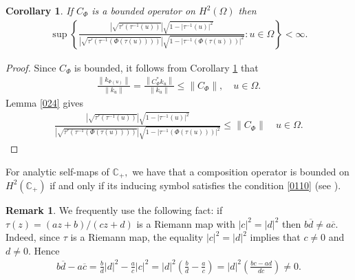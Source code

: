 \documentclass[11pt]{amsart}%
\newtheorem{cor}[thm]{Corollary}
\newtheorem{pps}[thm]{Proposition}
\theoremstyle{definition}
\newtheorem{rem}[thm]{Remark}
\theoremstyle{remark}
\numberwithin{equation}{section}
\begin{document}
\begin{cor}\label{0105} If $C_{\Phi}$ is a bounded operator on $H^2(\Omega)$ then 
\begin{align}\label{0110}
\sup\left\lbrace \frac{|\sqrt{\tau'(\tau^{-1}(u))}|\sqrt{1-|\tau^{-1}(u)|^2}}{|\sqrt{\tau'(\tau^{-1}(\Phi(\tau(u))))}|\sqrt{1-|\tau^{-1}(\Phi(\tau(u)))|^2}}:u\in \Omega\right\rbrace  < \infty.
\end{align}
\end{cor}
\begin{proof} Since $C_{\Phi}$ is bounded, it follows from Corollary \ref{0105} that
\begin{align*}
\frac{\left\| k_{\Phi(u)}\right\|}{\left\| k_u\right\| }=\frac{\left\| C_{\Phi}^*k_u\right\|}{\left\| k_u\right\| } \leq \left\| C_{\Phi}\right\| , \quad u\in \Omega.
\end{align*} 
 Lemma \ref{024} gives
\begin{align*}
\frac{|\sqrt{\tau'(\tau^{-1}(u))}|\sqrt{1-|\tau^{-1}(u)|^2}}{|\sqrt{\tau'(\tau^{-1}(\Phi(\tau(u))))}|\sqrt{1-|\tau^{-1}(\Phi(\tau(u)))|^2}}\leq \left\| C_{\Phi}\right\| \quad u\in \Omega.
\end{align*}
\end{proof}
For analytic self-maps of $\mathbb{C}_+,$ we have that a composition operator is bounded on $H^2(\mathbb{C}_+)$ if and only if its inducing symbol satisfies the condition \eqref{0110} (see \cite[Theorem 3.1]{Elliot-Jury}).

\begin{rem}
\label{078} We frequently use the following fact: if $\tau(z)=(az+b)/(cz+d)$
is a Riemann map with $|c|^{2}=|d|^{2}$ then $b\overline{d}\neq a\overline
{c}.$ Indeed, since $\tau$ is a Riemann map, the equality $|c|^{2}=|d|^{2}$
implies that $c\neq0$ and $d\neq0.$ Hence
\begin{align*}
b\overline{d}-a\overline{c}=\frac{b}{d}|d|^{2}-\frac{a}{c}|c|^{2}%
=|d|^{2}\left(  \frac{b}{d}-\frac{a}{c}\right)  =|d|^{2}\left(  \frac
{bc-ad}{dc}\right)  \neq0.
\end{align*}
\end{rem}




\end{document}

